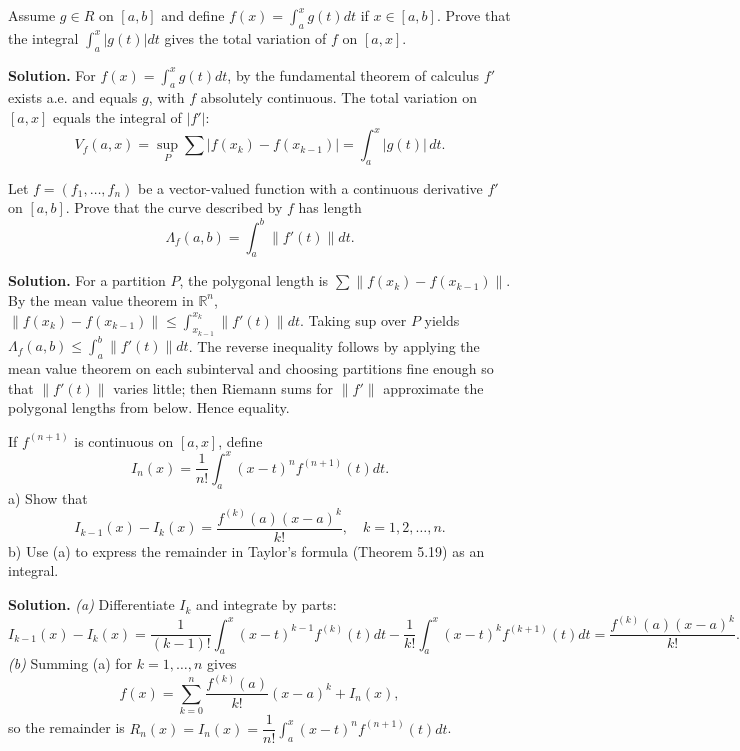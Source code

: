 \begin{problembox}
Assume $g \in R$ on $[a, b]$ and define $f(x) = \int_a^x g(t) dt$ if $x \in [a, b]$. Prove that the integral $\int_a^x |g(t)| dt$ gives the total variation of $f$ on $[a, x]$.
\end{problembox}

\noindent\textbf{Solution.}
For $f(x)=\int_a^x g(t)dt$, by the fundamental theorem of calculus $f'$ exists a.e. and equals $g$, with $f$ absolutely continuous. The total variation on $[a,x]$ equals the integral of $|f'|$:
\[V_f(a,x)=\sup_{P}\sum|f(x_k)-f(x_{k-1})|=\int_a^x |g(t)|\,dt.
\]
\medskip

\begin{problembox}
Let $f = (f_1, \ldots, f_n)$ be a vector-valued function with a continuous derivative $f'$ on $[a, b]$. Prove that the curve described by $f$ has length 
\[\Lambda_f(a, b) = \int_a^b \|f'(t)\| dt.\]
\end{problembox}

\noindent\textbf{Solution.}
For a partition $P$, the polygonal length is $\sum\|f(x_k)-f(x_{k-1})\|$. By the mean value theorem in $\mathbb{R}^n$, $\|f(x_k)-f(x_{k-1})\|\le \int_{x_{k-1}}^{x_k}\|f'(t)\|dt$. Taking sup over $P$ yields $\Lambda_f(a,b)\le\int_a^b\|f'(t)\|dt$. The reverse inequality follows by applying the mean value theorem on each subinterval and choosing partitions fine enough so that $\|f'(t)\|$ varies little; then Riemann sums for $\|f'\|$ approximate the polygonal lengths from below. Hence equality.
\medskip

\begin{problembox}
If $f^{(n+1)}$ is continuous on $[a, x]$, define 
\[I_n(x) = \frac{1}{n!} \int_a^x (x - t)^n f^{(n+1)}(t) dt.\]
a) Show that 
\[I_{k-1}(x) - I_k(x) = \frac{f^{(k)}(a)(x - a)^k}{k!}, \quad k = 1, 2, \ldots, n.\]
b) Use (a) to express the remainder in Taylor's formula (Theorem 5.19) as an integral.
\end{problembox}

\noindent\textbf{Solution.}
\textit{(a)} Differentiate $I_k$ and integrate by parts:
\[I_{k-1}(x)-I_k(x)=\frac{1}{(k-1)!}\int_a^x (x-t)^{k-1} f^{(k)}(t)dt-\frac{1}{k!}\int_a^x (x-t)^k f^{(k+1)}(t)dt=\frac{f^{(k)}(a)(x-a)^k}{k!}.
\]
\textit{(b)} Summing (a) for $k=1,\dots,n$ gives
\[f(x)=\sum_{k=0}^n \frac{f^{(k)}(a)}{k!}(x-a)^k+I_n(x),\]
so the remainder is $R_n(x)=I_n(x)=\dfrac{1}{n!}\int_a^x (x-t)^n f^{(n+1)}(t)dt$.
\medskip

